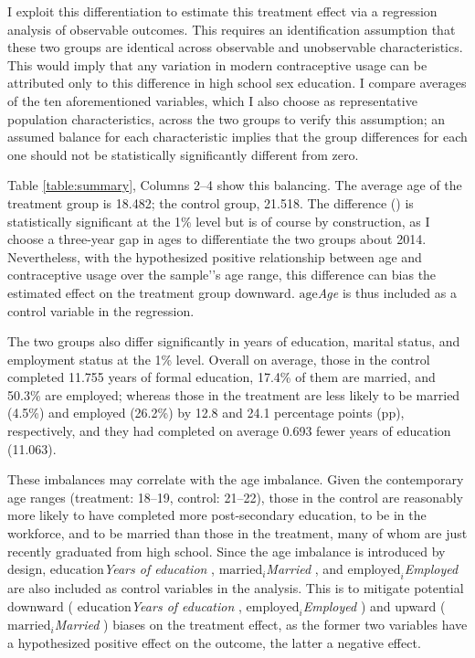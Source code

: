\documentclass[12pt]{article}
\newcommand{\age}{%
    \ifmmode\ensuremath{\text{age}}\else\textit{Age}\fi
}
\newcommand{\educ}{%
    \ifmmode\ensuremath{\textrm{education}}\else\textit{Years of education}\fi
}
\newcommand{\married}{%
    \ifmmode\ensuremath{\textrm{married}_i}\else\textit{Married}\fi
}
\newcommand{\employed}{%
    \ifmmode\ensuremath{\textrm{employed}_i}\else\textit{Employed}\fi
}
\begin{document}
    I exploit this differentiation to estimate this treatment effect via a regression analysis of observable outcomes.
    This requires an identification assumption that these two groups are identical across observable and unobservable characteristics.
    This would imply that any variation in modern contraceptive usage can be attributed only to this difference in high school sex education.
    I compare averages of the ten aforementioned variables, which I also choose as representative population characteristics, across the two groups to verify this assumption; an assumed balance for each characteristic implies that the group differences for each one should not be statistically significantly different from zero.

    Table \ref{table:summary}, Columns 2--4 show this balancing.
    The average age of the treatment group is 18.482; the control group, 21.518.
    The difference () is statistically significant at the 1\% level but is of course by construction, as I choose a three-year gap in ages to differentiate the two groups about 2014.
    Nevertheless, with the hypothesized positive relationship between age and contraceptive usage over the sample’'s age range, this difference can bias the estimated effect on the treatment group downward.
    \age{} is thus included as a control variable in the regression.

    The two groups also differ significantly in years of education, marital status, and employment status at the 1\% level.
    Overall on average, those in the control completed 11.755 years of formal education, 17.4\% of them are married, and 50.3\% are employed; whereas those in the treatment are less likely to be married (4.5\%) and employed (26.2\%) by 12.8 and 24.1 percentage points (pp), respectively, and they had completed on average 0.693 fewer years of education (11.063).

    These imbalances may correlate with the age imbalance.
    Given the contemporary age ranges (treatment: 18--19, control: 21--22), those in the control are reasonably more likely to have completed more post-secondary education, to be in the workforce, and to be married than those in the treatment, many of whom are just recently graduated from high school.
    Since the age imbalance is introduced by design, \educ{}, \married{}, and \employed{} are also included as control variables in the analysis.
    This is to mitigate potential downward (\educ{}, \employed{}) and upward (\married{}) biases on the treatment effect, as the former two variables have a hypothesized positive effect on the outcome, the latter a negative effect.
\end{document}
